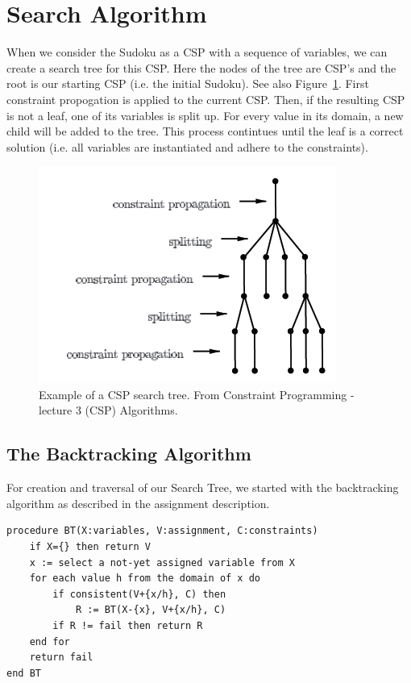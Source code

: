 \documentclass[11pt]{article} %
\begin{document}
\section{Search Algorithm}

When we consider the Sudoku as a CSP with a sequence of variables, we can create a search tree for this CSP. Here the nodes of the tree are CSP's and the root is our starting CSP (i.e. the initial Sudoku). See also Figure~\ref{fig:basic_tree}. First constraint propogation is applied to the current CSP. Then, if the resulting CSP is not a leaf, one of its variables is split up. For every value in its domain, a new child will be added to the tree. This process contintues until the leaf is a correct solution (i.e. all variables are instantiated and adhere to the constraints).

\begin{figure}
\includegraphics{tree.png}
\caption{Example of a CSP search tree. From Constraint Programming - lecture 3 (CSP) Algorithms. }
\label{fig:basic_tree}
\end{figure}

\subsection{The Backtracking Algorithm}

For creation and traversal of our Search Tree, we started with the backtracking algorithm as described in the assignment description.

\begin{verbatim}
procedure BT(X:variables, V:assignment, C:constraints)
    if X={} then return V
    x := select a not-yet assigned variable from X
    for each value h from the domain of x do
        if consistent(V+{x/h}, C) then
            R := BT(X-{x}, V+{x/h}, C)
        if R != fail then return R
    end for
    return fail
end BT
\end{verbatim}
\end{document}
